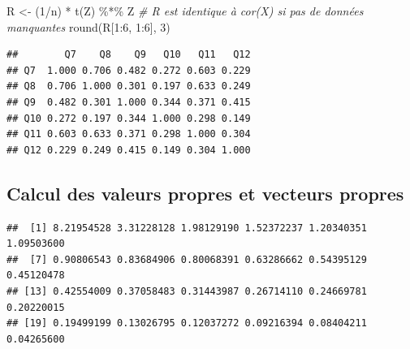 \documentclass[
]{article}
\newenvironment{Shaded}{\begin{snugshade}}{\end{snugshade}}
\newcommand{\CommentTok}[1]{\textcolor[rgb]{0.56,0.35,0.01}{\textit{#1}}}
\newcommand{\DecValTok}[1]{\textcolor[rgb]{0.00,0.00,0.81}{#1}}
\newcommand{\FunctionTok}[1]{\textcolor[rgb]{0.00,0.00,0.00}{#1}}
\newcommand{\NormalTok}[1]{#1}
\newcommand{\OtherTok}[1]{\textcolor[rgb]{0.56,0.35,0.01}{#1}}
\newcommand{\SpecialCharTok}[1]{\textcolor[rgb]{0.00,0.00,0.00}{#1}}
\begin{document}
\begin{Shaded}
\begin{Highlighting}[]
\NormalTok{R }\OtherTok{\textless{}{-}}\NormalTok{ (}\DecValTok{1}\SpecialCharTok{/}\NormalTok{n) }\SpecialCharTok{*} \FunctionTok{t}\NormalTok{(Z) }\SpecialCharTok{\%*\%}\NormalTok{ Z}
\CommentTok{\# R est identique à cor(X) si pas de données manquantes}
\FunctionTok{round}\NormalTok{(R[}\DecValTok{1}\SpecialCharTok{:}\DecValTok{6}\NormalTok{, }\DecValTok{1}\SpecialCharTok{:}\DecValTok{6}\NormalTok{], }\DecValTok{3}\NormalTok{)}
\end{Highlighting}
\end{Shaded}

\begin{verbatim}
##        Q7    Q8    Q9   Q10   Q11   Q12
## Q7  1.000 0.706 0.482 0.272 0.603 0.229
## Q8  0.706 1.000 0.301 0.197 0.633 0.249
## Q9  0.482 0.301 1.000 0.344 0.371 0.415
## Q10 0.272 0.197 0.344 1.000 0.298 0.149
## Q11 0.603 0.633 0.371 0.298 1.000 0.304
## Q12 0.229 0.249 0.415 0.149 0.304 1.000
\end{verbatim}

\hypertarget{calcul-des-valeurs-propres-et-vecteurs-propres}{%
\subsection{Calcul des valeurs propres et vecteurs
propres}\label{calcul-des-valeurs-propres-et-vecteurs-propres}}

\begin{Shaded}
\end{Shaded}

\begin{verbatim}
##  [1] 8.21954528 3.31228128 1.98129190 1.52372237 1.20340351 1.09503600
##  [7] 0.90806543 0.83684906 0.80068391 0.63286662 0.54395129 0.45120478
## [13] 0.42554009 0.37058483 0.31443987 0.26714110 0.24669781 0.20220015
## [19] 0.19499199 0.13026795 0.12037272 0.09216394 0.08404211 0.04265600
\end{verbatim}
\end{document}
